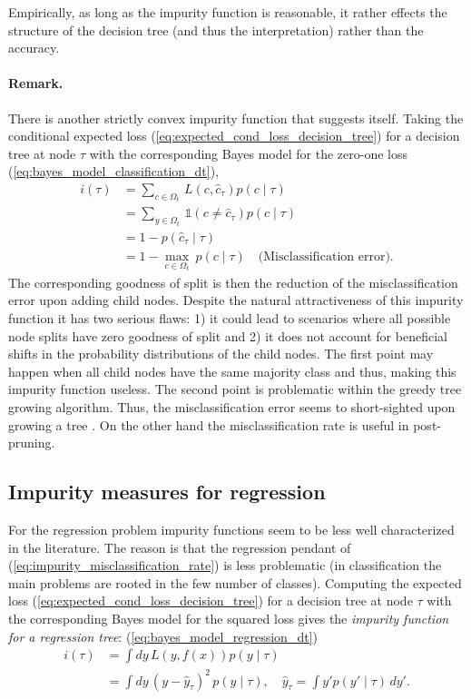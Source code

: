 \documentclass[12pt,a4paper]{article}
\begin{document}
Empirically, as long as the impurity function is reasonable, it rather effects the structure of the decision tree (and thus the interpretation) rather than the accuracy.

\paragraph{Remark.}There is another strictly convex impurity function that suggests itself. Taking the conditional expected loss (\ref{eq:expected_cond_loss_decision_tree}) for a decision tree at node $\tau$ with the corresponding Bayes model for the zero-one loss (\ref{eq:bayes_model_classification_dt}), 
\begin{align} \label{eq:impurity_misclassification_rate}
	i(\tau) &= \sum_{c\in \Omega_t} \,L(c, \hat c_\tau) p(c \mid \tau)  \nonumber \\ 
	 &=\sum_{y\in \Omega_t} \, \mathbb 1 (c \neq \hat c_\tau) p(c \mid \tau)  \nonumber \\
	 &= 1 - p(\hat c_\tau \mid \tau)  \nonumber \\ 
	&= 1 - \underset{c\in \Omega_t}{\operatorname{max}} ~ p(c \mid\tau) \quad \text{(Misclassification error)}.
\end{align}    
The corresponding goodness of split is then the reduction of the misclassification  error upon adding child nodes. 
Despite the natural attractiveness of this impurity function it has two serious flaws: 1) it could lead to scenarios where all possible node splits have zero goodness of split and 2) it does not account for beneficial shifts in the probability distributions of the child nodes. 
The first point may happen when all child nodes have the same majority class \cite{cart84, understanding_random_forests} and thus, making this impurity function useless. The second point is problematic within the greedy tree growing algorithm. Thus, the misclassification error seems to short-sighted upon growing a tree \cite{cart84, hasties}.  On the other hand the misclassification rate is useful in post-pruning.

\subsection{Impurity measures for regression}
For the regression problem  impurity functions seem to be less well characterized in the literature. The reason is that the regression pendant of (\ref{eq:impurity_misclassification_rate})  is less problematic (in classification the main problems are rooted in the few number of classes). Computing the expected loss (\ref{eq:expected_cond_loss_decision_tree}) for a decision tree at node $\tau$ with the corresponding Bayes model for the squared loss gives the \textit{impurity function for a regression tree}:
(\ref{eq:bayes_model_regression_dt})
\begin{align} 
	i(\tau) & = \int dy\,L(y, f(x)) p(y \mid \tau) \nonumber \\
	 & =  \int dy\,(y -  \hat y_\tau)^2 \, p(y \mid \tau), \quad \hat y_\tau=\int  y' p(y' \mid \tau)\, dy'. \label{eq:impurity_measure_regression}
\end{align}
\end{document}
